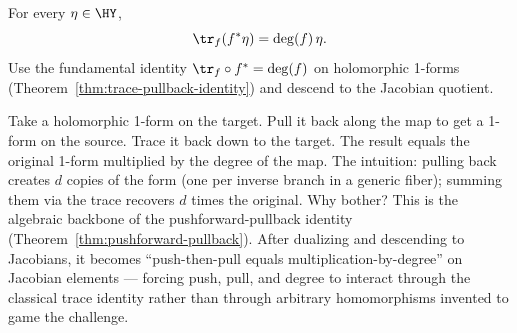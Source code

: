 
\begin{theorem}
\label{thm:trace-pullback}
For every \(\eta\in\HY\),
\[
  \tr_f(f^{*}\eta)=\deg(f)\,\eta.
\]
\leanok
\proofplan
Use the fundamental identity \(\tr_f \circ f^* = \deg(f)\) on holomorphic 1-forms
(Theorem~\ref{thm:trace-pullback-identity}) and descend to the Jacobian quotient.
\end{theorem}

\begin{layman}
Take a holomorphic 1-form on the target. Pull it back along the map
to get a 1-form on the source. Trace it back down to the target. The
result equals the original 1-form multiplied by the degree of the
map. The intuition: pulling back creates \(d\) copies of the form (one
per inverse branch in a generic fiber); summing them via the trace
recovers \(d\) times the original. Why bother? This is the algebraic
backbone of the pushforward-pullback identity
(Theorem~\ref{thm:pushforward-pullback}). After dualizing and
descending to Jacobians, it becomes ``push-then-pull equals
multiplication-by-degree'' on Jacobian elements --- forcing push, pull,
and degree to interact through the classical trace identity rather
than through arbitrary homomorphisms invented to game the challenge.
\end{layman}
